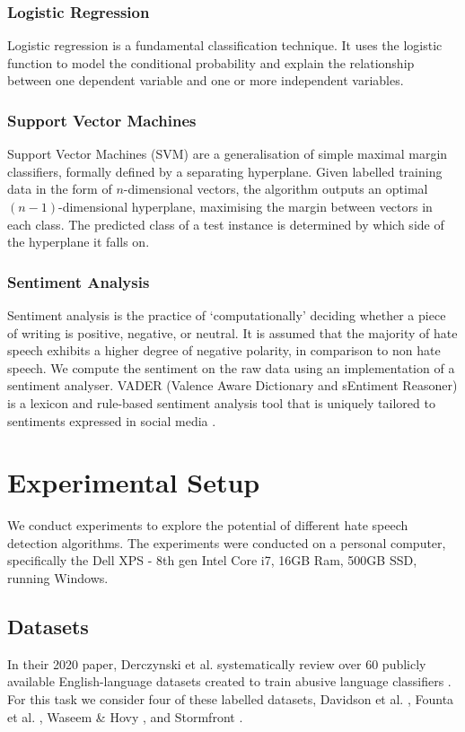 \documentclass[a4paper,12pt]{report}
\begin{document}
	
	\subsubsection{Logistic Regression}
	Logistic regression is a fundamental classification technique. It uses the logistic function to model the conditional probability and explain the relationship between one dependent variable and one or more independent variables.  
	
	\subsubsection{Support Vector Machines}
	Support Vector Machines (SVM) are a generalisation of simple maximal margin classifiers, formally defined by a separating hyperplane. Given labelled training data in the form of $n$-dimensional vectors, the algorithm outputs an optimal $(n-1)$-dimensional hyperplane, maximising the margin between vectors in each class. The predicted class of a test instance is determined by which side of the hyperplane it falls on.
	
	\subsubsection{Sentiment Analysis}
	Sentiment analysis is the practice of ‘computationally' deciding whether a piece of writing is positive, negative, or neutral. It is assumed that the majority of hate speech exhibits a higher degree of negative polarity, in comparison to non hate speech. We compute the sentiment on the raw data using an implementation of a sentiment analyser. VADER (Valence Aware Dictionary and sEntiment Reasoner) is a lexicon and rule-based sentiment analysis tool that is uniquely tailored to sentiments expressed in social media \cite{hutto2014vader}.
	
	\section{Experimental Setup}
	We conduct experiments to explore the potential of different hate speech detection algorithms. The experiments were conducted on a personal computer, specifically the  Dell XPS - 8th gen Intel Core i7, 16GB Ram, 500GB SSD, running Windows.
	
	\subsection{Datasets}
	In their 2020 paper, Derczynski et al. systematically review over 60 publicly available English-language datasets created to train abusive language classifiers \cite{vidgen2020directions}. For this task we consider four of these labelled datasets, Davidson et al. \cite{davidson2017automated}, Founta et al. \cite{founta2018large}, Waseem \& Hovy \cite{waseem-hovy:2016:N16-2}, and Stormfront \cite{waseem-hovy:2016:N16-2}.
	
\end{document}
